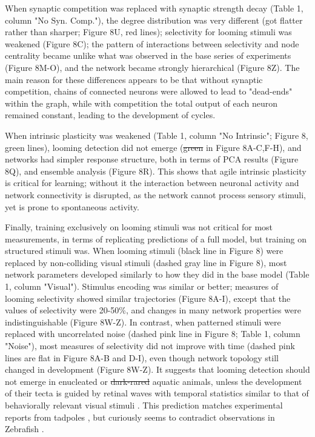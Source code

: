 \documentclass{article}
\providecommand{\DIFaddtex}[1]{{\protect\color{blue}{#1}}} %
\providecommand{\DIFdeltex}[1]{{\protect\color{red}\sout{#1}}}                      %
\providecommand{\DIFaddbegin}{} %
\providecommand{\DIFaddend}{} %
\providecommand{\DIFdelbegin}{} %
\providecommand{\DIFdelend}{} %
\providecommand{\DIFadd}[1]{\texorpdfstring{\DIFaddtex{#1}}{#1}} %
\providecommand{\DIFdel}[1]{\texorpdfstring{\DIFdeltex{#1}}{}} %
\newcommand{\DIFscaledelfig}{0.5}
\newlength{\DIFdelgraphicswidth} %
\newlength{\DIFdelgraphicsheight} %
\newcommand{\DIFaddincludegraphics}[2][]{{\color{blue}\fbox{\DIFOincludegraphics[#1]{#2}}}} %
\newcommand{\DIFdelincludegraphics}[2][]{%
\sbox{\DIFdelgraphicsbox}{\DIFOincludegraphics[#1]{#2}}%
\settoboxwidth{\DIFdelgraphicswidth}{\DIFdelgraphicsbox} %
\settoboxtotalheight{\DIFdelgraphicsheight}{\DIFdelgraphicsbox} %
\scalebox{\DIFscaledelfig}{%
\parbox[b]{\DIFdelgraphicswidth}{\usebox{\DIFdelgraphicsbox}\\[-\baselineskip] \rule{\DIFdelgraphicswidth}{0em}}\llap{\resizebox{\DIFdelgraphicswidth}{\DIFdelgraphicsheight}{%
\setlength{\unitlength}{\DIFdelgraphicswidth}%
\begin{picture}(1,1)%
\thicklines\linethickness{2pt} %
{\color[rgb]{1,0,0}\put(0,0){\framebox(1,1){}}}%
{\color[rgb]{1,0,0}\put(0,0){\line( 1,1){1}}}%
{\color[rgb]{1,0,0}\put(0,1){\line(1,-1){1}}}%
\end{picture}%
}\hspace*{3pt}}} %
} %
\DeclareRobustCommand{\DIFaddbegin}{\DIFOaddbegin \let\includegraphics\DIFaddincludegraphics} %
\DeclareRobustCommand{\DIFaddend}{\DIFOaddend \let\includegraphics\DIFOincludegraphics} %
\DeclareRobustCommand{\DIFdelbegin}{\DIFOdelbegin \let\includegraphics\DIFdelincludegraphics} %
\DeclareRobustCommand{\DIFdelend}{\DIFOaddend \let\includegraphics\DIFOincludegraphics} %
\begin{document}
When synaptic competition was replaced with synaptic strength decay (Table 1, column "No Syn. Comp."), the degree distribution was very different (got flatter rather than sharper; Figure 8U, red lines); selectivity for looming stimuli was weakened (Figure 8C); the pattern of interactions between selectivity and node centrality became unlike what was observed in the base series of experiments (Figure 8M-O), and the network became strongly hierarchical (Figure 8Z). The main reason for these differences appears to be that without synaptic competition, chains of connected neurons were allowed to lead to "dead-ends" within the graph, while with competition the total output of each neuron remained constant, leading to the development of cycles. 

When intrinsic plasticity was weakened (Table 1, column "No Intrinsic"; Figure 8, \DIFaddbegin \DIFadd{dotted }\DIFaddend green lines), looming detection did not emerge (\DIFdelbegin \DIFdel{green }\DIFdelend \DIFaddbegin \DIFadd{bottom lines }\DIFaddend in Figure 8A-C,F-H), and networks had simpler response structure, both in terms of PCA results (Figure 8Q), and ensemble analysis (Figure 8R). This shows that agile intrinsic plasticity is critical for learning; without it the interaction between neuronal activity and network connectivity is disrupted, as the network cannot process sensory stimuli, yet is prone to spontaneous activity.

Finally, training exclusively on looming stimuli was not critical for most measurements, in terms of replicating predictions of a full model, but training on structured stimuli was. When looming stimuli (black line in Figure 8) were replaced by non-colliding visual stimuli (dashed gray line in Figure 8), most network parameters developed similarly to how they did in the base model (Table 1, column "Visual"). Stimulus encoding was similar or better; measures of looming selectivity showed similar trajectories (Figure 8A-I), except that the values of selectivity were 20-50\%, and changes in many network properties were indistinguishable (Figure 8W-Z). In contrast, when patterned stimuli were replaced with uncorrelated noise (dashed pink line in Figure 8; Table 1, column "Noise"), most measures of selectivity did not improve with time (dashed pink lines are flat in Figure 8A-B and D-I), even though network topology still changed in development (Figure 8W-Z). It suggests that looming detection should not emerge in enucleated or \DIFdelbegin \DIFdel{dark-rared }\DIFdelend \DIFaddbegin \DIFadd{dark-reared }\DIFaddend aquatic animals, unless the development of their tecta is guided by retinal waves with temporal statistics similar to that of behaviorally relevant visual stimuli \citep{huberman2008waves}. This prediction matches experimental reports from tadpoles \citep{xu2011}, but curiously seems to contradict observations in Zebrafish \citep{pietri2017emergence}.
\end{document}
